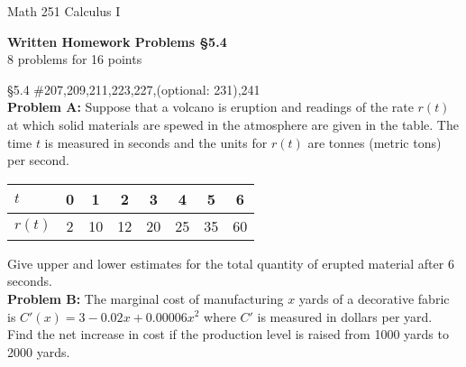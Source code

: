 \documentclass[11pt]{report}
\theoremstyle{plain}
\begin{document}
\hfill Math 251 Calculus I
\begin{center}
\Large{\textbf{Written Homework Problems \S 5.4}} \\
8 problems for 16 points\\
\end{center}

\begin{description}
\item{\S 5.4} \#207,209,211,223,227,(optional: 231),241\\

\textbf{Problem A:} Suppose that a volcano is eruption and readings of the rate $r(t)$ at which solid materials are spewed in the atmosphere are given in the table. The time $t$ is measured in seconds and the units for $r(t)$ are tonnes (metric tons) per second.\\

\begin{tabular}{l | c|c|c|c|c|c|c}
$t$&0&1&2&3&4&5&6\\
\hline
$r(t)$&2&10&12&20&25&35&60\\
\end{tabular}

Give upper and lower estimates for the total quantity of erupted material after 6 seconds.\\


\textbf{Problem B:} The marginal cost of manufacturing $x$ yards of a decorative fabric is $C'(x) = 3-0.02x+0.00006x^2$ where $C'$ is measured in dollars per yard. Find the net increase in cost if the production level is raised from 1000 yards to 2000 yards.

\end{description}
\end{document}
